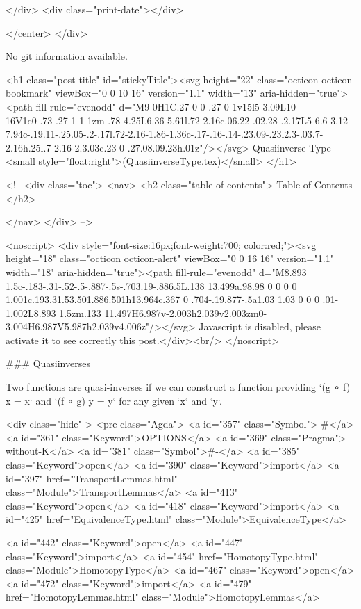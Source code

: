           
        </div>
        <div class="print-date"></div>
        
        
    </center>
  </div>

  
  No git information available.
  

  <h1 class="post-title" id="stickyTitle"><svg height="22" class="octicon octicon-bookmark" viewBox="0 0 10 16" version="1.1" width="13" aria-hidden="true"><path fill-rule="evenodd" d="M9 0H1C.27 0 0 .27 0 1v15l5-3.09L10 16V1c0-.73-.27-1-1-1zm-.78 4.25L6.36 5.61l.72 2.16c.06.22-.02.28-.2.17L5 6.6 3.12 7.94c-.19.11-.25.05-.2-.17l.72-2.16-1.86-1.36c-.17-.16-.14-.23.09-.23l2.3-.03.7-2.16h.25l.7 2.16 2.3.03c.23 0 .27.08.09.23h.01z"/></svg> Quasiinverse Type <small style="float:right">(QuasiinverseType.tex)</small>
  </h1>

  <!-- 
  <div class="toc">
    <nav>
    <h2 class="table-of-contents"> Table of Contents </h2>
      

    </nav>
  </div>
   -->

  <noscript>
  <div style="font-size:16px;font-weight:700; color:red;"><svg height="18" class="octicon octicon-alert" viewBox="0 0 16 16" version="1.1" width="18" aria-hidden="true"><path fill-rule="evenodd" d="M8.893 1.5c-.183-.31-.52-.5-.887-.5s-.703.19-.886.5L.138 13.499a.98.98 0 0 0 0 1.001c.193.31.53.501.886.501h13.964c.367 0 .704-.19.877-.5a1.03 1.03 0 0 0 .01-1.002L8.893 1.5zm.133 11.497H6.987v-2.003h2.039v2.003zm0-3.004H6.987V5.987h2.039v4.006z"/></svg> Javascript is disabled, please activate it to see correctly this post.</div><br/>
  </noscript>

  ### Quasiinverses

Two functions are quasi-inverses if we can construct a function providing
`(g ∘ f) x = x` and `(f ∘ g) y = y` for any given `x` and `y`.

<div class="hide" >
<pre class="Agda">
<a id="357" class="Symbol">{-#</a> <a id="361" class="Keyword">OPTIONS</a> <a id="369" class="Pragma">--without-K</a> <a id="381" class="Symbol">#-}</a>
<a id="385" class="Keyword">open</a> <a id="390" class="Keyword">import</a> <a id="397" href="TransportLemmas.html" class="Module">TransportLemmas</a>
<a id="413" class="Keyword">open</a> <a id="418" class="Keyword">import</a> <a id="425" href="EquivalenceType.html" class="Module">EquivalenceType</a>

<a id="442" class="Keyword">open</a> <a id="447" class="Keyword">import</a> <a id="454" href="HomotopyType.html" class="Module">HomotopyType</a>
<a id="467" class="Keyword">open</a> <a id="472" class="Keyword">import</a> <a id="479" href="HomotopyLemmas.html" class="Module">HomotopyLemmas</a>


